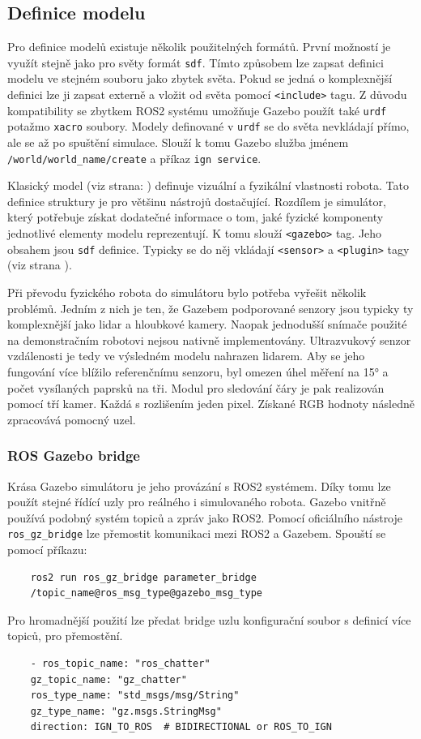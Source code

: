 \subsection*{Definice modelu}
Pro definice modelů existuje několik použitelných formátů. První možností je využít stejně jako pro světy formát \verb|sdf|. Tímto způsobem lze zapsat definici modelu ve stejném souboru jako zbytek světa. Pokud se jedná o komplexnější definici lze ji zapsat externě a vložit od světa pomocí \verb|<include>| tagu. Z důvodu kompatibility se zbytkem ROS2 systému umožňuje Gazebo použít také \verb|urdf| potažmo \verb|xacro| soubory. Modely definované v \verb|urdf| se do světa nevkládají přímo, ale  se až po spuštění simulace. Slouží k tomu Gazebo služba jménem \verb|/world/world_name/create| a příkaz \verb|ign service|.

Klasický model (viz strana: \pageref{implementation:model}) definuje vizuální a fyzikální vlastnosti robota. Tato definice struktury je pro většinu nástrojů dostačující. Rozdílem je simulátor, který potřebuje získat dodatečné informace o tom, jaké fyzické komponenty jednotlivé elementy modelu reprezentují. K tomu slouží \verb|<gazebo>| tag. Jeho obsahem jsou \verb|sdf| definice. Typicky se do něj vkládají \verb|<sensor>| a \verb|<plugin>| tagy (viz strana \pageref{theory:gazebo}). 

Při převodu fyzického robota do simulátoru bylo potřeba vyřešit několik problémů. Jedním z nich je ten, že Gazebem podporované senzory jsou typicky ty komplexnější jako lidar a hloubkové kamery. Naopak jednodušší snímače použité na demonstračním robotovi nejsou nativně implementovány. Ultrazvukový senzor vzdálenosti je tedy ve výsledném modelu nahrazen lidarem. Aby se jeho fungování více blížilo referenčnímu senzoru, byl omezen úhel měření na 15° a počet vysílaných paprsků na tři. Modul pro sledování čáry je pak realizován pomocí tří kamer. Každá s rozlišením jeden pixel. Získané RGB hodnoty následně zpracovává pomocný uzel.

\subsubsection*{ROS Gazebo bridge}
Krása Gazebo simulátoru je jeho provázání s ROS2 systémem. Díky tomu lze použít stejné řídící uzly pro reálného i simulovaného robota. Gazebo vnitřně používá podobný systém topiců a zpráv jako ROS2. Pomocí oficiálního nástroje \verb|ros_gz_bridge| lze přemostit komunikaci mezi ROS2 a Gazebem. Spouští se pomocí příkazu:
\begin{verbatim}
	ros2 run ros_gz_bridge parameter_bridge 
	/topic_name@ros_msg_type@gazebo_msg_type
\end{verbatim}
Pro hromadnější použití lze předat bridge uzlu konfigurační soubor s definicí více topiců, pro přemostění.
\begin{verbatim}
	- ros_topic_name: "ros_chatter"
	gz_topic_name: "gz_chatter"
	ros_type_name: "std_msgs/msg/String"
	gz_type_name: "gz.msgs.StringMsg"
	direction: IGN_TO_ROS  # BIDIRECTIONAL or ROS_TO_IGN
\end{verbatim}

